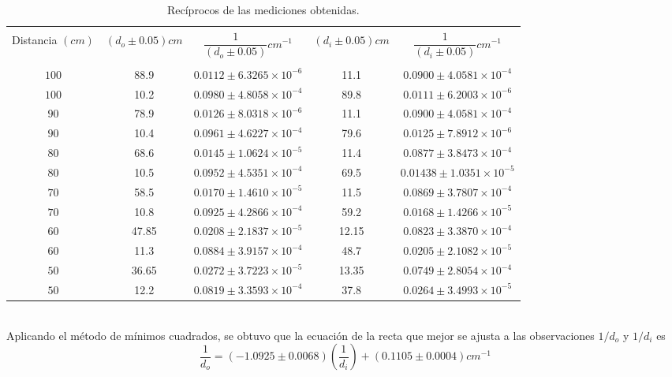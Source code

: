 \documentclass[10pt,a4paper]{article}
\begin{document}
\begin{table}[ht]
\centering
\caption{Recíprocos de las mediciones obtenidas.}		
\begin{tabular}{|c|c|c|c|c|}
	\hline & & & &\\
	Distancia $(cm)$ & $(d_o \pm 0.05) cm$ & $\dfrac{1}{(d_o \pm 0.05)} cm^{-1}$ & $(d_i \pm 0.05) cm$ & $\dfrac{1}{(d_i \pm 0.05)} cm^{-1}$ \\ & & & &\\ 	\hline
	$100$ & 88.9 & $0.0112\pm6.3265\times10^{-6}$ & 11.1 & $0.0900\pm4.0581\times10^{-4}$ \\ 	\hline
	$100$ & 10.2 & $0.0980\pm4.8058\times10^{-4}$ & 89.8 & $0.0111\pm6.2003\times10^{-6}$ \\ 	\hline
	$90$ & 78.9 & $0.0126\pm8.0318\times10^{-6}$ & 11.1 & $0.0900\pm4.0581\times10^{-4}$ \\ 	\hline
	$90$ & 10.4 & $0.0961\pm4.6227\times10^{-4}$ & 79.6 & $0.0125\pm7.8912\times10^{-6}$ \\ 	\hline
	$80$ & 68.6 & $0.0145\pm1.0624\times10^{-5}$ & 11.4 & $0.0877\pm3.8473\times10^{-4}$ \\ 	\hline
	$80$ & 10.5 & $0.0952\pm4.5351\times10^{-4}$ & 69.5 & $0.01438\pm1.0351\times10^{-5}$ \\ 	\hline
	$70$ & 58.5 & $0.0170\pm1.4610\times10^{-5}$ & 11.5 & $0.0869\pm3.7807\times10^{-4}$ \\ 	\hline
	$70$ & 10.8 & $0.0925\pm4.2866\times10^{-4}$ & 59.2 & $0.0168\pm1.4266\times10^{-5}$ \\ 	\hline
	$60$ & 47.85 & $0.0208\pm2.1837\times10^{-5}$ & 12.15 & $0.0823\pm3.3870\times10^{-4}$ \\ 	\hline
	$60$ & 11.3 & $0.0884\pm3.9157\times10^{-4}$ & 48.7 & $0.0205\pm2.1082\times10^{-5}$ \\ 	\hline
	$50$ & 36.65 & $0.0272\pm3.7223\times10^{-5}$ & 13.35 & $0.0749\pm2.8054\times10^{-4}$ \\ 	\hline
	$50$ & 12.2 & $0.0819\pm3.3593\times10^{-4}$ & 37.8 & $0.0264\pm3.4993\times10^{-5}$ \\ 	\hline
\end{tabular}
	\label{tab:exp3}
\end{table}\\
Aplicando el método de mínimos cuadrados, se obtuvo que la ecuación de la recta que mejor se ajusta a las observaciones $1/d_o$ y $1/d_i$ es
\begin{equation}
	\dfrac{1}{d_o}=(-1.0925\pm 0.0068)\left(\dfrac{1}{d_i}\right)+(0.1105\pm 0.0004)cm^{-1}
	\label{eq:regresion}
\end{equation}
\end{document}

